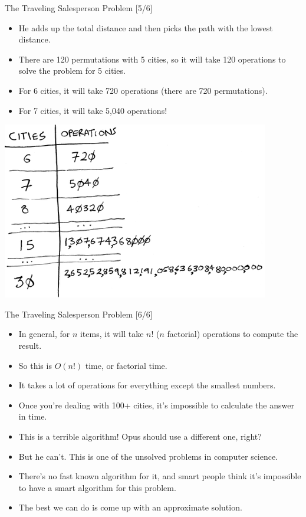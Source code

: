 \documentclass[ignorenonframetext,]{beamer}
\providecommand{\tightlist}{%
  \setlength{\itemsep}{0pt}\setlength{\parskip}{0pt}}
\begin{document}
\begin{frame}{The Traveling Salesperson Problem {[}5/6{]}}
\protect\hypertarget{the-traveling-salesperson-problem-56}{}

\begin{itemize}
\tightlist
\item
  He adds up the total distance and then picks the path with the lowest
  distance.
\item
  There are 120 permutations with 5 cities, so it will take 120
  operations to solve the problem for 5 cities.
\item
  For 6 cities, it will take 720 operations (there are 720
  permutations).
\item
  For 7 cities, it will take 5,040 operations!
\end{itemize}

\includegraphics{./Chapter01-figure/travelling_salesperson_04.png}

\end{frame}

\begin{frame}{The Traveling Salesperson Problem {[}6/6{]}}
\protect\hypertarget{the-traveling-salesperson-problem-66}{}

\begin{itemize}
\tightlist
\item
  In general, for \(n\) items, it will take \(n!\) (\(n\) factorial)
  operations to compute the result.
\item
  So this is \(O(n!)\) time, or factorial time.
\item
  It takes a lot of operations for everything except the smallest
  numbers.
\item
  Once you're dealing with 100+ cities, it's impossible to calculate the
  answer in time.
\item
  This is a terrible algorithm! Opus should use a different one, right?
\item
  But he can't. This is one of the unsolved problems in computer
  science.
\item
  There's no fast known algorithm for it, and smart people think it's
  impossible to have a smart algorithm for this problem.
\item
  The best we can do is come up with an approximate solution.
\end{itemize}

\end{frame}
\end{document}
